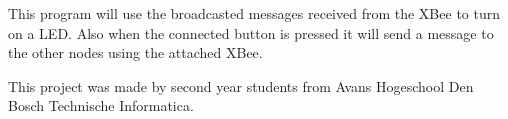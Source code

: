 This program will use the broadcasted messages received from the X\+Bee to turn on a L\+ED. Also when the connected button is pressed it will send a message to the other nodes using the attached X\+Bee.

This project was made by second year students from Avans Hogeschool Den Bosch Technische Informatica. 